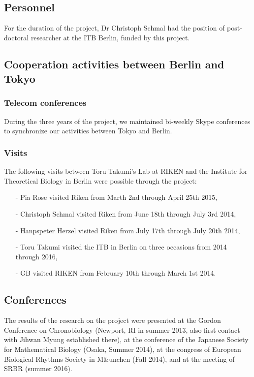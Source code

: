\documentclass[a4paper]{article}
\begin{document}
\subsection{Personnel}
For the duration of the project, Dr Christoph Schmal had the position
of post-doctoral researcher at the ITB Berlin, funded by this project.

\subsection{Cooperation activities between Berlin and Tokyo}

\subsubsection{Telecom conferences}
During the three years of the project, we maintained bi-weekly Skype
conferences to synchronize our activities between Tokyo and Berlin.

\subsubsection{Visits}
The following visits between Toru Takumi's Lab at RIKEN and the
Institute for Theoretical Biology in Berlin were possible through the
project:
\begin{itemize}
  \item[-] Pia Rose visited Riken from Marth 2nd through April 25th 2015,
  \item[-] Christoph Schmal visited Riken from June 18th through July 3rd
  2014,
  \item[-] Hanpspeter Herzel visited Riken from July 17th through July
  20th 2014,
  \item[-] Toru Takumi visited the ITB in Berlin on three occasions from
  2014 through 2016,
  \item[-] GB visited RIKEN from February 10th through March 1st 2014.
\end{itemize}

\subsection{Conferences}
The results of the research on the project were presented at the
Gordon Conference on Chronobiology (Newport, RI in summer 2013, also
first contact with Jihwan Myung established there), at the conference
of the Japanese Society for Mathematical Biology (Osaka, Summer 2014),
at the congress of European Biological Rhythms Society in M\&unchen
(Fall 2014), and at the meeting of SRBR (summer 2016).
\end{document}
